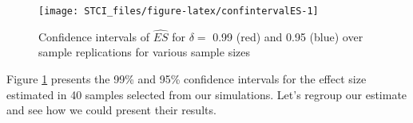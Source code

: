 \documentclass[]{book}
\newenvironment{Shaded}{\begin{snugshade}}{\end{snugshade}}
\newcommand{\KeywordTok}[1]{\textcolor[rgb]{0.13,0.29,0.53}{\textbf{#1}}}
\newcommand{\DataTypeTok}[1]{\textcolor[rgb]{0.13,0.29,0.53}{#1}}
\newcommand{\DecValTok}[1]{\textcolor[rgb]{0.00,0.00,0.81}{#1}}
\newcommand{\StringTok}[1]{\textcolor[rgb]{0.31,0.60,0.02}{#1}}
\newcommand{\CommentTok}[1]{\textcolor[rgb]{0.56,0.35,0.01}{\textit{#1}}}
\newcommand{\OperatorTok}[1]{\textcolor[rgb]{0.81,0.36,0.00}{\textbf{#1}}}
\newcommand{\NormalTok}[1]{#1}
\theoremstyle{definition}
\theoremstyle{definition}
\theoremstyle{definition}
\theoremstyle{remark}
\begin{document}
\begin{Shaded}
\end{Shaded}

\begin{figure}[htbp]

{\centering \texttt{[image: STCI\_files/figure-latex/confintervalES-1]} 

}

\caption{Confidence intervals of $\hat{ES}$ for $\delta=$ 0.99 (red) and 0.95 (blue) over sample replications for various sample sizes}\label{fig:confintervalES}
\end{figure}

Figure \ref{fig:confintervalES} presents the 99\% and 95\% confidence
intervals for the effect size estimated in 40 samples selected from our
simulations. Let's regroup our estimate and see how we could present
their results.
\end{document}
